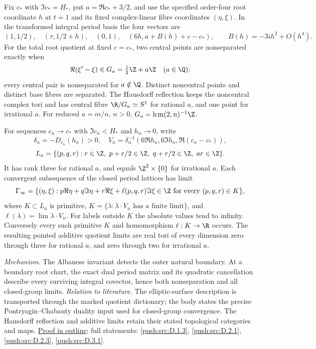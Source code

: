 Fix $c_*$ with $\Im c_*=H_*$, put $a=\Re c_*+3/2$, and use the
specified order-four root coordinate $h$ at $t=1$ and its fixed
complex-linear fibre coordinates $(\eta,\xi)$.  In the transformed
integral period basis the four vectors are
\[
 (1,1/2),\quad(\tau,1/2+h),\quad(0,1),
 \quad(6h,a+B(h)+c-c_*),
 \qquad B(h)=-3ih^2+O(h^4).
\]
For the total root quotient at fixed $c=c_*$, two central points
are nonseparated exactly when
\[
 \Re(\xi'-\xi)\in G_a=\tfrac12\Z+a\Z\quad(a\in\Q);
\]
every central pair is nonseparated for $a\notin\Q$.  Distinct
noncentral points and distinct base fibres are separated.
The Hausdorff reflection keeps the noncentral complex tori and
has central fibre $\R/G_a\simeq S^1$ for rational $a$, and one
point for irrational $a$.  For reduced $a=m/n$, $n>0$,
$G_a=\operatorname{lcm}(2,n)^{-1}\Z$.

For sequences $c_n\to c_*$ with $\Im c_n<H_*$ and $h_n\to0$,
write
\[
 \delta_n=-D_{c_n}(h_n)>0,\quad
 V_n=\delta_n^{-1}(6\Re h_n,6\Im h_n,\Re(c_n-c_*)),
\]
\[
 L_a=\{(p,q,r):r\in\Z,\ p+r/2\in\Z,
                      \ q+r/2\in\Z,\ ar\in\Z\}.
\]
It has rank three for rational $a$, and equals
$\Z^2\times\{0\}$ for irrational $a$.  Each convergent
subsequence of the closed period lattices has limit
\[
 \Gamma_\infty=\{(\eta,\xi):p\Re\eta+q\Im\eta+r\Re\xi
       +\ell(p,q,r)\Im\xi\in\Z\text{ for every }(p,q,r)\in K\},
\]
where $K\subset L_a$ is primitive,
$K=\{\lambda:\lambda\cdot V_n\text{ has a finite limit}\}$,
and $\ell(\lambda)=\lim\lambda\cdot V_n$.
For labels outside $K$ the absolute values tend to infinity.
Conversely every such primitive $K$ and homomorphism
$\ell:K\to\R$ occurs.  The resulting pointed additive quotient
limits are real tori of every dimension zero through three for
rational $a$, and zero through two for irrational $a$.

\textit{Mechanism.} The Albanese invariant detects the outer
natural boundary.  At a boundary root chart, the exact dual
period matrix and its quadratic cancellation describe every
surviving integral covector, hence both nonseparation and all
closed-group limits.
\textit{Relation to literature.} The elliptic-surface description
is transported through the marked quotient dictionary; the body
states the precise Pontryagin--Chabauty duality input used for
closed-group convergence.  The Hausdorff reflection and additive
limits retain their stated topological categories and maps.
\hyperlink{outline-I-G}{Proof in outline}; full statements:
\ref{push:src:D.1.3}, \ref{push:src:D.2.1},
\ref{push:src:D.2.3}, \ref{push:src:D.3.1}.

